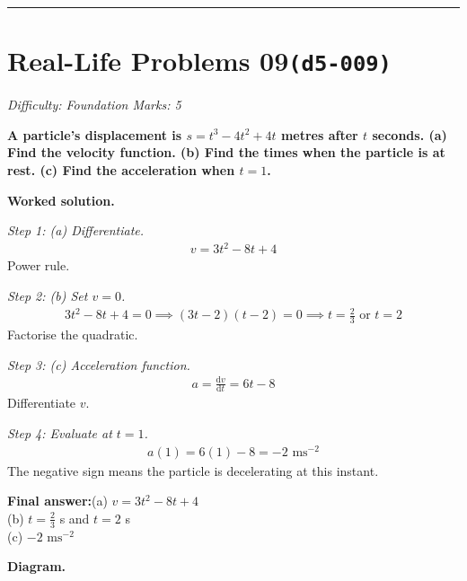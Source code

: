 \documentclass[11pt]{article}
\newcommand{\question}[1]{\par\medskip\noindent\textbf{#1}\par}
\begin{document}
\medskip\hrule

\section*{Real-Life Problems 09\quad\small\texttt{(d5-009)}}
\textit{Difficulty: Foundation \quad\textbar\quad Marks: 5}

\question{A particle's displacement is \( s = t^3 - 4t^2 + 4t \) metres after \( t \) seconds. (a) Find the velocity function. (b) Find the times when the particle is at rest. (c) Find the acceleration when \( t = 1 \).}

\textbf{Worked solution.}

\textit{Step 1: (a) Differentiate.}
\[\begin{gathered}
v = 3t^2 - 8t + 4
\end{gathered}\]
Power rule.

\textit{Step 2: (b) Set \( v = 0 \).}
\[\begin{gathered}
3t^2 - 8t + 4 = 0 \implies (3t - 2)(t - 2) = 0 \implies t = \tfrac{2}{3} \text{ or } t = 2
\end{gathered}\]
Factorise the quadratic.

\textit{Step 3: (c) Acceleration function.}
\[\begin{gathered}
a = \frac{\mathrm{d}v}{\mathrm{d}t} = 6t - 8
\end{gathered}\]
Differentiate \( v \).

\textit{Step 4: Evaluate at \( t = 1 \).}
\[\begin{gathered}
a(1) = 6(1) - 8 = -2 \text{ ms}^{-2}
\end{gathered}\]
The negative sign means the particle is decelerating at this instant.

\begin{answerbox}
\textbf{Final answer:}\quad (a) \(\displaystyle  v = 3t^2 - 8t + 4 \) \\[3pt]  (b) \(\displaystyle  t = \tfrac{2}{3} \) s and \(\displaystyle  t = 2 \) s \\[3pt]  (c) \(\displaystyle  -2 \text{ ms}^{-2} \)
\end{answerbox}
\textbf{Diagram.}
\end{document}
